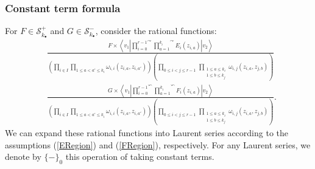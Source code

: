 \documentclass{amsart}
\theoremstyle{remark}
\numberwithin{thm}{section}
\numberwithin{equation}{section}
\begin{document}
\subsubsection{Constant term formula}
For $F\in\mathcal{S}^+_{k_\bullet}$ and $G\in\mathcal{S}^-_{k_\bullet}$, consider the rational functions:
\begin{align*}
&\frac{\displaystyle F\times\left\langle v_1\left| \overset{\curvearrowright}{\prod_{i=0}^{r-1}}\overset{\curvearrowright}{\prod_{a=1}^{k_i}} E_{i}(z_{i,a})\right|v_2\right\rangle}
{\displaystyle\left(\prod_{i\in I}\prod_{1\le a<a'\le k_i}\omega_{i,i}(z_{i,a},z_{i,a'})\right)
\left(\prod_{0\le i< j\le r-1}\,\prod_{\substack{1\le a\le k_i\\1\le b\le k_j}}\omega_{i,j}(z_{i,a},z_{j,b})\right)}\\
&\frac{\displaystyle G\times\left\langle v_1\left| \overset{\curvearrowleft}{\prod_{i=0}^{r-1}}\overset{\curvearrowleft}{\prod_{a=1}^{k_i}} F_{i}(z_{i,a})\right|v_2\right\rangle}
{\displaystyle\left(\prod_{i\in I}\prod_{1\le a<a'\le k_i}\omega_{i,i}(z_{i,a},z_{i,a'})\right)
\left(\prod_{0\le i< j\le r-1}\,\prod_{\substack{1\le a\le k_i\\1\le b\le k_j}}\omega_{i,j}(z_{i,a},z_{j,b})\right)}.
\end{align*}
We can expand these rational functions into Laurent series according to the assumptions (\ref{ERegion}) and (\ref{FRegion}), respectively.
For any Laurent series, we denote by $\{-\}_0$ this operation of taking constant terms.
\end{document}
